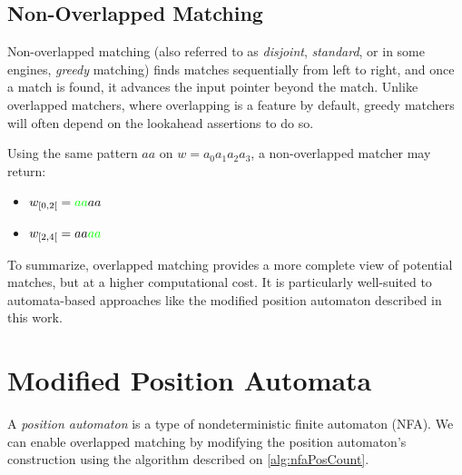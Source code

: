 \subsection*{Non-Overlapped Matching}
Non-overlapped matching (also referred to as \emph{disjoint}, \emph{standard}, or in some engines, \emph{greedy} matching) finds matches sequentially from left to right, and once a match is found, it advances the input pointer beyond the match. Unlike overlapped matchers, where overlapping is a feature by default, greedy matchers will often depend on the lookahead assertions to do so.

Using the same pattern $aa$ on $w = a_0 a_1 a_2 a_3$, a non-overlapped matcher may return:

\begin{itemize}
	\item $w_{[0,2[} = {\color{green}{aa}}aa$
	\item $w_{[2,4[} = aa{\color{green}{aa}}$
\end{itemize}

To summarize, overlapped matching provides a more complete view of potential matches, but at a higher computational cost. It is particularly well-suited to automata-based approaches like the modified position automaton described in this work.


\section{Modified Position Automata}
A \emph{position automaton} is a type of nondeterministic finite automaton (NFA).
We can enable overlapped matching by modifying the position automaton's construction using the algorithm described on  \ref{alg:nfaPosCount}.


